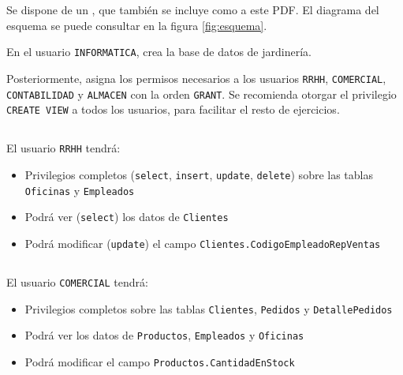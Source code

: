 Se dispone de un , que también se incluye como  a este PDF. El diagrama del esquema se puede consultar en la figura \ref{fig:esquema}.

\newenvironment{homeworkProblem2}[1][]{
  \subsection {#1}
}{
}

\begin{homeworkProblem}
  En el usuario \texttt{INFORMATICA}, crea la base de datos de jardinería.

  Posteriormente, asigna los permisos necesarios a los usuarios \texttt{RRHH}, \texttt{COMERCIAL}, \texttt{CONTABILIDAD} y \texttt{ALMACEN} con la orden \texttt{GRANT}.   Se recomienda otorgar el privilegio \texttt{CREATE VIEW} a todos los usuarios, para facilitar el resto de ejercicios.

  \begin{homeworkProblem2}[]
    El usuario \texttt{RRHH} tendrá:
    \begin{itemize}
    \item Privilegios completos (\texttt{select}, \texttt{insert}, \texttt{update}, \texttt{delete}) sobre las tablas \texttt{Oficinas} y \texttt{Empleados}
    \item Podrá ver (\texttt{select}) los datos de \texttt{Clientes}
    \item Podrá modificar (\texttt{update}) el campo \texttt{Clientes.CodigoEmpleadoRepVentas}
    \end{itemize}
  \end{homeworkProblem2}

  \begin{homeworkProblem2}[\imenutwo{Usuario \texttt{COMERCIAL} (25\%)}]
    El usuario \texttt{COMERCIAL} tendrá:
    \begin{itemize}
    \item Privilegios completos sobre las tablas \texttt{Clientes}, \texttt{Pedidos} y \texttt{DetallePedidos}
    \item Podrá ver  los datos de \texttt{Productos}, \texttt{Empleados} y \texttt{Oficinas} 
    \item Podrá modificar el campo \texttt{Productos.CantidadEnStock}
    \end{itemize}
  \end{homeworkProblem2}


\end{homeworkProblem}
